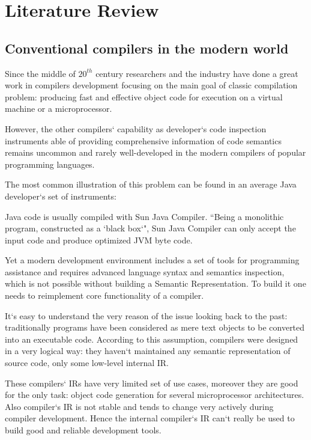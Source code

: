 \chapter{Literature Review}
\label{chap:lr}

\section{Conventional compilers in the modern world}
\label{sec:review_1}

Since the middle of $20^{th}$ century researchers and the industry have done a great
work in compilers development focusing on the main goal of classic compilation
problem: producing fast and effective object code for execution on a virtual
machine or a microprocessor.


However, the other compilers` capability as developer`s code inspection
instruments able of providing comprehensive information of code semantics
remains uncommon and rarely well-developed in the modern compilers of
popular programming languages.


The most common illustration of this problem can be found in an average Java
developer`s set of instruments:

Java code is usually compiled with Sun Java Compiler. ``Being a
monolithic program, constructed as a `black box`"\cite{Zouev2005}, Sun Java Compiler can only accept the input
code and produce optimized JVM byte code.


Yet a modern development environment includes a set of tools for
programming assistance and requires advanced language syntax and
semantics inspection, which is not possible without building a Semantic
Representation\cite{Zouev2005}. To build it one needs to reimplement core functionality of a
compiler.


It`s easy to understand the very reason of the issue looking back to the past:
traditionally programs have been considered as mere text objects to be
converted into an executable code. According to this assumption, compilers
were designed in a very logical way: they haven`t maintained any semantic
representation of source code, only some low-level internal IR.


These compilers` IRs have very limited set of use cases\cite{Zouev2005, Zouev2010}, moreover they are
good for the only task: object code generation for several microprocessor
architectures. Also compiler`s IR is not stable and tends to change very actively
during compiler development\cite{FreeSoftwareFoundation2016}. Hence the internal compiler`s IR can`t really
be used to build good and reliable development tools.


